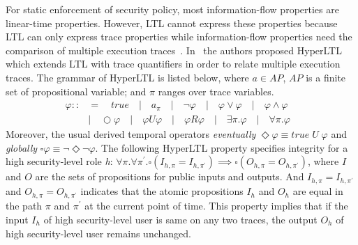 
For static enforcement of security policy, 
most information-flow properties are linear-time properties.
However, LTL cannot express these properties because LTL can only express trace properties while information-flow properties need the comparison of multiple execution traces~\cite{rabe2016temporal}.
In~\cite{rabe2016temporal} the authors proposed HyperLTL which extends LTL with trace quantifiers in order to relate multiple execution traces.
The grammar of HyperLTL is listed below, where $a \in AP$, $AP$ is a finite set of propositional variable; and $\pi$ ranges over trace variables.
\begin{align*}
	\varphi ::&= \quad true \quad |\quad  a_{\pi} \quad | \quad \neg \varphi \quad | \quad \varphi \lor \varphi \quad | \quad \varphi \land \varphi \quad \\
	& | \quad \bigcirc \varphi \quad  | \quad \varphi U \varphi \quad | \quad \varphi R \varphi \quad | \quad \exists \pi . \varphi \quad | \quad \forall \pi . \varphi 
\end{align*}
Moreover, the usual derived temporal operators \textit{eventually} $\Diamond \varphi \equiv true \; U \; \varphi$ and \textit{globally} $\square \varphi \equiv \neg \Diamond \neg \varphi$.
The following HyperLTL property specifies integrity for a high security-level role \textit{h}:
$
\forall \pi. \forall \pi^{'}.\square (I_{h,\pi} = I_{h,\pi^{'}})\implies \square (O_{h, \pi} = O_{h,\pi^{'}})
$, where $\mathit{I}$ and $\mathit{O}$ are the sets of propositions for public inputs and outputs.
And $ I_{h,\pi} = I_{h,\pi^{'}}$ and $O_{h, \pi} = O_{h,\pi^{'}}$ indicates that the atomic propositions $I_h$ and $O_h$ are equal in the path $\pi$ and $\pi^{'}$ at the current point of time. 
This property implies that if the input $I_h$ of high security-level user is same on any two traces, the output $O_h$ of high security-level user remains unchanged. 

